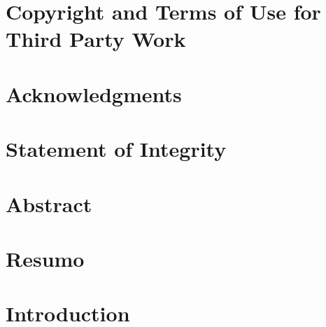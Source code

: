 \documentclass[12pt]{report}
\begin{document}



\setcounter{page}{1}

\chapter*{Copyright and Terms of Use for Third Party Work}

    

\chapter*{Acknowledgments}

    

\chapter*{Statement of Integrity}

    

\chapter*{Abstract}

    
    
\chapter*{Resumo}

    
    
\cleardoublepage
\tableofcontents

\cleardoublepage
{}
\listoffigures
	
\cleardoublepage
{}
\listoftables

\cleardoublepage
\printglossaries
{}

\cleardoublepage
{}
\setcounter{page}{1}
    
\chapter{Introduction}

    
\end{document}

